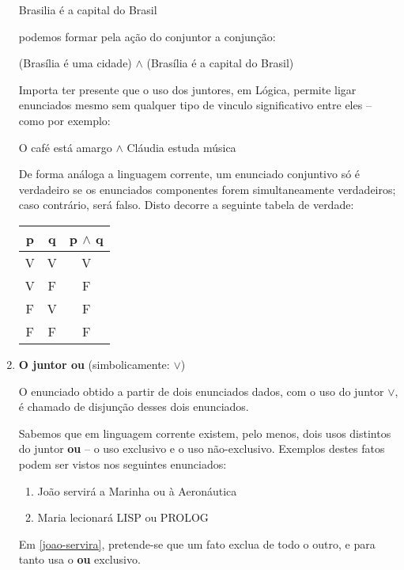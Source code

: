 \begin{enumerate}[label=\textbf{(\arabic*)}]
\begin{center}
        Brasilia é a capital do Brasil
    \end{center}

    podemos formar pela ação do conjuntor a conjunção:

    \begin{center}
        (Brasília é uma cidade) $\land$ (Brasília é a capital do Brasil)
    \end{center}

    Importa ter presente que o uso dos juntores, em  Lógica, permite ligar enunciados mesmo sem qualquer tipo de vinculo significativo entre eles -- como por exemplo:

    O café está amargo $\land$ Cláudia estuda música

    De forma análoga a linguagem corrente, um  enunciado conjuntivo só é verdadeiro se os  enunciados componentes forem simultaneamente verdadeiros; caso contrário, será falso.
    Disto decorre a seguinte tabela de verdade:

    \begin{center}
        \begin{tabular}{c c c}
        p & q & p $\land$ q \\ \hline
        V & V & V \\
        V & F & F \\
        F & V & F \\
        F & F & F
        \end{tabular}
    \end{center}


    \item \textbf{O juntor ou} (simbolicamente: $\lor$)

    O enunciado obtido a partir de dois enunciados dados, com o uso do juntor $\lor$, é chamado de disjunção desses dois enunciados.

    Sabemos que em  linguagem corrente existem, pelo menos, dois usos distintos do juntor \textbf{ou} -- o uso exclusivo e o uso não-exclusivo.
    Exemplos destes fatos podem ser vistos nos seguintes enunciados:

    \begin{enumerate}[label=(\arabic*)]
        \item João servirá a Marinha ou à Aeronáutica \label{joao-servira}
        \item Maria lecionará LISP ou PROLOG \label{maria-lecionara}
    \end{enumerate}

    Em \ref{joao-servira}, pretende-se que um fato exclua de todo o outro, e para tanto usa o \textbf{ou} exclusivo.


\end{enumerate}
